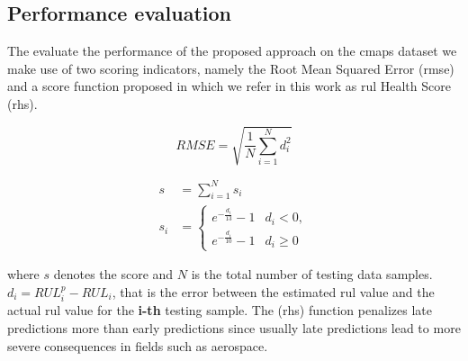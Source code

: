 \subsection{Performance evaluation}
\label{sec:rul_metrics}

The evaluate the performance of the proposed approach on the \gls{cmaps} dataset we make use of two scoring indicators, namely the Root Mean Squared Error (\gls{rmse}) and a score function proposed in \cite{Saxena2008} which we refer in this work as \gls{rul} Health Score (\gls{rhs}). 

\begin{equation}
RMSE = \sqrt{ \frac{1}{N} \sum_{i=1}^{N}{d_i^2}}
\label{eq:rmse}
\end{equation}

\begin{align}
s &= \sum_{i=1}^{N}{s_i} \nonumber \\
s_i &= \begin{cases} 
      e^{-\frac{d_i}{13}} - 1 & d_i < 0, \\
      e^{-\frac{d_i}{10}} - 1 & d_i \geq 0
\end{cases}
\label{eq:rhs}
\end{align}

where $s$ denotes the score and $N$ is the total number of testing data samples. $d_i = RUL_i^p - RUL_i$, that is the error between the estimated \gls{rul} value and the actual \gls{rul} value for the \textbf{i-th} testing sample. The (\gls{rhs}) function penalizes late predictions more than early predictions since usually late predictions lead to more severe consequences in fields such as aerospace.

